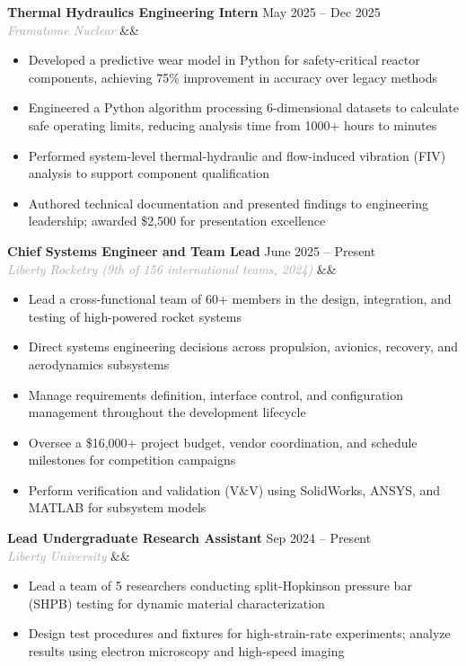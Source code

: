 \documentclass[10pt,letterpaper]{article}
\newcommand{\resumeEntry}[4]{
    \textbf{#1} \hfill \textcolor{medgray}{#2} \\
    \textit{\textcolor{darkgray}{#3}} \ifx&#4&\else\hfill \textcolor{medgray}{#4}\fi
    \vspace{0pt}
}
\begin{document}
\resumeEntry{Thermal Hydraulics Engineering Intern}{May 2025 -- Dec 2025}{Framatome Nuclear}{}
\begin{itemize}
    \item Developed a predictive wear model in Python for safety-critical reactor components, achieving 75\% improvement in accuracy over legacy methods
    \item Engineered a Python algorithm processing 6-dimensional datasets to calculate safe operating limits, reducing analysis time from 1000+ hours to minutes
    \item Performed system-level thermal-hydraulic and flow-induced vibration (FIV) analysis to support component qualification
    \item Authored technical documentation and presented findings to engineering leadership; awarded \$2,500 for presentation excellence
\end{itemize}

\vspace{1pt}

\resumeEntry{Chief Systems Engineer and Team Lead}{June 2025 -- Present}{Liberty Rocketry \textnormal{\textcolor{medgray}{(9th of 156 international teams, 2024)}}}{}
\begin{itemize}
    \item Lead a cross-functional team of 60+ members in the design, integration, and testing of high-powered rocket systems
    \item Direct systems engineering decisions across propulsion, avionics, recovery, and aerodynamics subsystems
    \item Manage requirements definition, interface control, and configuration management throughout the development lifecycle
    \item Oversee a \$16,000+ project budget, vendor coordination, and schedule milestones for competition campaigns
    \item Perform verification and validation (V\&V) using SolidWorks, ANSYS, and MATLAB for subsystem models
\end{itemize}

\vspace{1pt}

\resumeEntry{Lead Undergraduate Research Assistant}{Sep 2024 -- Present}{Liberty University}{}
\begin{itemize}
    \item Lead a team of 5 researchers conducting split-Hopkinson pressure bar (SHPB) testing for dynamic material characterization
    \item Design test procedures and fixtures for high-strain-rate experiments; analyze results using electron microscopy and high-speed imaging
\end{itemize}
\end{document}
